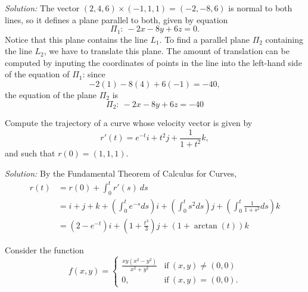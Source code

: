 \documentclass[11pt]{exam}
\begin{document}
\begin{questions}
\begin{parts}
\textit{Solution:} The vector $(2,4,6) \times (-1,1,1) = (-2,-8,6)$ is normal to both lines, so it defines a plane parallel to both, given by equation
\begin{equation*}
\Pi_1 \colon \ -2x -8y + 6z =0.
\end{equation*}
Notice that this plane contains the line $L_1$. To find a parallel plane $\Pi_2$ containing the line $L_2$, we have to translate this plane. The amount of translation can be computed by inputing the coordinates of points in the line into the left-hand side of the equation of $\Pi_1$: since 
\begin{equation*}
-2(1) -8(4) + 6(-1) = -40,
\end{equation*}
the equation of the plane $\Pi_2$ is 
\begin{equation*}
\Pi_2 \colon \ -2x -8y + 6z =-40
\end{equation*}

\vfill
\end{parts}

\newpage

\addpoints
\question[10] Compute the trajectory of a curve whose velocity vector is given by 
\begin{equation*}
r'(t)= e^{-t}i + t^2j + \frac{1}{1+t^2} k,
\end{equation*}
and such that $r(0)=(1,1,1)$. 

\textit{Solution:} By the Fundamental Theorem of Calculus for Curves, 
\begin{align*}
r(t) & = r(0) +\int_{0}^{t} r'(s)\ ds\\
& = i + j +k + \left(\int_{0}^{t} e^{-s}ds \right)i + \left(\int_{0}^{t} s^2 ds\right)j + \left( \int_{0}^{t}  \frac{1}{1+s^2} ds \right) k \\
& = (2-e^{-t})i + \left( 1+ \frac{t^3}{3} \right)j + (1+\arctan(t))k
\end{align*}

\newpage



\addpoints

\addpoints
\question Consider the function
\begin{equation*}
f(x,y)=\left\{
\begin{array}{rc}
\frac{xy(x^2-y^2)}{x^2+y^2} & \mbox{if} \ (x,y) \neq (0,0)\\
0, & \mbox{if} \ (x,y)=(0,0).
\end{array}
\right.
\end{equation*}


\end{questions}
\end{document}
